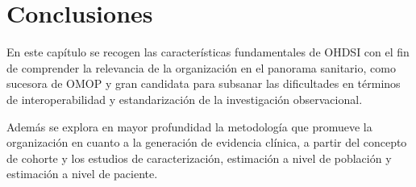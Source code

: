 \section{Conclusiones} \label{sec:05conclusion}

En este capítulo se recogen las características fundamentales de OHDSI con el fin de comprender la relevancia de la organización en el panorama sanitario, como sucesora de OMOP y gran candidata para subsanar las dificultades en términos de interoperabilidad y estandarización de la investigación observacional.

Además se explora en mayor profundidad la metodología que promueve la organización en cuanto a la generación de evidencia clínica, a partir del concepto de cohorte y los estudios de caracterización, estimación a nivel de población y estimación a nivel de paciente.